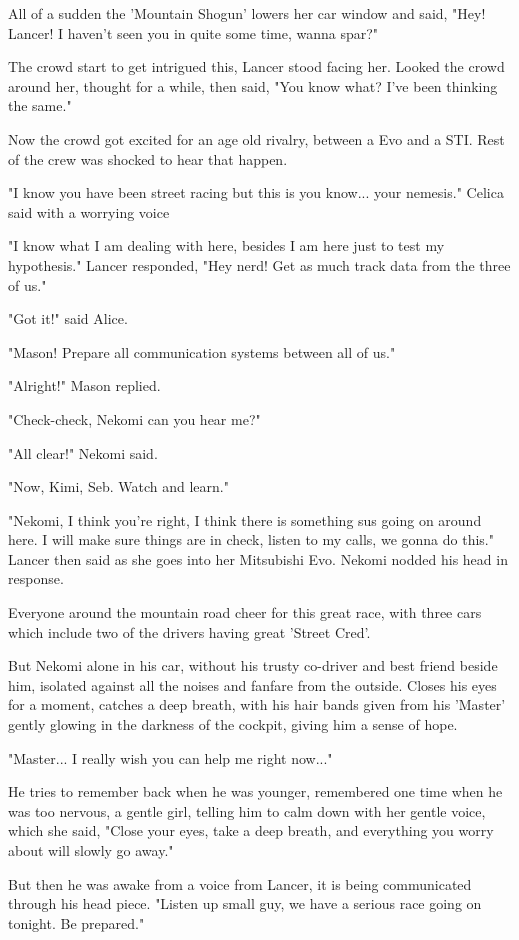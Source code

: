 All of a sudden the 'Mountain Shogun' lowers her car window and said, "Hey! Lancer! I haven't seen you in quite some time, wanna spar?"

The crowd start to get intrigued this, Lancer stood facing her. Looked the crowd around her, thought for a while, then said, "You know what? I've been thinking the same."

Now the crowd got excited for an age old rivalry, between a Evo and a STI. Rest of the crew was shocked to hear that happen.

"I know you have been street racing but this is you know... your nemesis." Celica said with a worrying voice

"I know what I am dealing with here, besides I am here just to test my hypothesis." Lancer responded, "Hey nerd! Get as much track data from the three of us."

"Got it!" said Alice.

"Mason! Prepare all communication systems between all of us."

"Alright!" Mason replied.

"Check-check, Nekomi can you hear me?"

"All clear!" Nekomi said.

"Now, Kimi, Seb. Watch and learn."

"Nekomi, I think you're right, I think there is something sus going on around here. I will make sure things are in check, listen to my calls, we gonna do this." Lancer then said as she goes into her Mitsubishi Evo. Nekomi nodded his head in response.

Everyone around the mountain road cheer for this great race, with three cars which include two of the drivers having great 'Street Cred'.

But Nekomi alone in his car, without his trusty co-driver and best friend beside him, isolated against all the noises and fanfare from the outside. Closes his eyes for a moment, catches a deep breath, with his hair bands given from his 'Master' gently glowing in the darkness of the cockpit, giving him a sense of hope. 

"Master... I really wish you can help me right now..."

He tries to remember back when he was younger, remembered one time when he was too nervous, a gentle girl, telling him to calm down with her gentle voice, which she said, "Close your eyes, take a deep breath, and everything you worry about will slowly go away."

But then he was awake from a voice from Lancer, it is being communicated through his head piece. "Listen up small guy, we have a serious race going on tonight. Be prepared."

